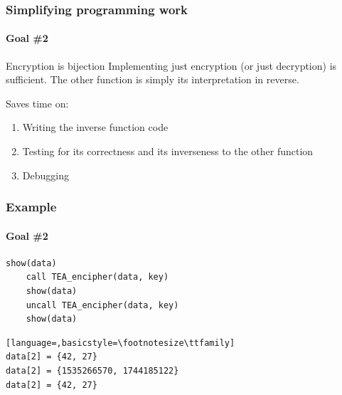 \documentclass{beamer}
\begin{document}
\addtocounter{page}{1}
\begin{frame}
\addtocounter{page}{-1}
\frametitle{Simplifying programming work}
\framesubtitle{\hspace{5mm}Goal \#2} 

\pause
\begin{block}{Encryption is bijection}
Implementing just encryption (or just decryption) is sufficient. 
The other function is simply its interpretation in reverse.
\end{block}

\pause
\begin{block}{}
Saves time on:
\begin{enumerate}
\item Writing the inverse function code
\item Testing for its correctness and its inverseness to the other function
\item Debugging
\end{enumerate}
\end{block}

\end{frame}




\addtocounter{page}{1}
\begin{frame}[fragile]
\addtocounter{page}{-1}
\frametitle{Example}
\framesubtitle{\hspace{5mm}Goal \#2} 

\begin{lstlisting}[language=Janus]
    show(data)
    call TEA_encipher(data, key)
    show(data)
    uncall TEA_encipher(data, key)
    show(data)
\end{lstlisting}

\begin{lstlisting}[language=,basicstyle=\footnotesize\ttfamily]
data[2] = {42, 27}
data[2] = {1535266570, 1744185122}
data[2] = {42, 27}
\end{lstlisting}


\end{frame}
\end{document}
